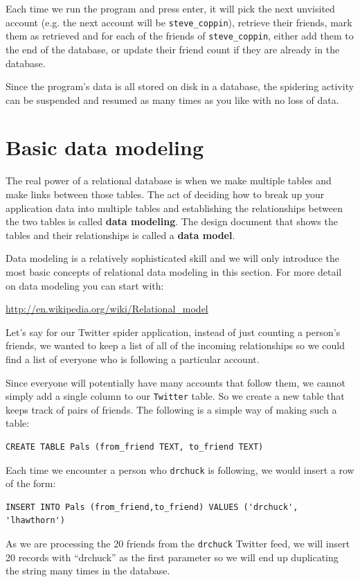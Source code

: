\documentclass[11pt]{book}
\begin{document}
Each time we run the program and press enter, it will pick the next 
unvisited account (e.g. the next account will be \verb"steve_coppin"),
retrieve their friends, mark them as retrieved and for each of the 
friends of \verb"steve_coppin", either add them to the end of the 
database, or update their friend count if they are already in the
database.

Since the program's data is all stored on disk in a database, 
the spidering activity can be suspended and resumed as many times as you 
like with no loss of data.

\section{Basic data modeling}

The real power of a relational database is when we make multiple tables
and make links between those tables.   The act of deciding how to break
up your application data into multiple tables and establishing the
relationships between the two tables is called {\bf data modeling}.  The
design document that shows the tables and their relationships 
is called a {\bf data model}.

Data modeling is a relatively sophisticated skill and we will only introduce
the most basic concepts of relational data modeling in this section.  For more
detail on data modeling you can start with:

\url{http://en.wikipedia.org/wiki/Relational_model}

Let's say for our Twitter spider application, instead of just 
counting a person's friends, we wanted to keep a list of 
all of the incoming relationships so we could find a list of 
everyone who is following a particular account.

Since everyone will potentially have many accounts that follow
them, we cannot simply add a single column to our {\tt Twitter} table. 
So we create a new table that keeps track of pairs of friends.
The following is a simple way of making such a table:

\beforeverb
\begin{verbatim}
CREATE TABLE Pals (from_friend TEXT, to_friend TEXT)
\end{verbatim}
\afterverb
%
Each time we encounter a person who {\tt drchuck} is following, we
would insert a row of the form:

\beforeverb
\begin{verbatim}
INSERT INTO Pals (from_friend,to_friend) VALUES ('drchuck', 'lhawthorn')
\end{verbatim}
\afterverb
%
As we are processing the 20 friends from the {\tt drchuck}
Twitter feed, we will insert 20 records with ``drchuck''
as the first parameter so we will end up duplicating the 
string many times in the database.
\end{document}
